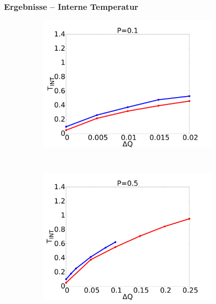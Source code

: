 \documentclass{beamer}
\begin{document}
\begin{frame}
\frametitle{Ergebnisse -- Interne Temperatur}
\begin{figure}
    \begin{center}
        \begin{subfigure}[t]{0.3\textwidth}
            \includegraphics[scale=0.11]{../images/p01_int.pdf}
        \end{subfigure} 
        \
        \begin{subfigure}[t]{0.3\textwidth}
            \includegraphics[scale=0.11]{../images/p05_int.pdf}
        \end{subfigure} 
        \
        \begin{subfigure}[t]{0.3\textwidth}

\end{subfigure}
\end{center}
\end{figure}
\end{frame}
\end{document}
